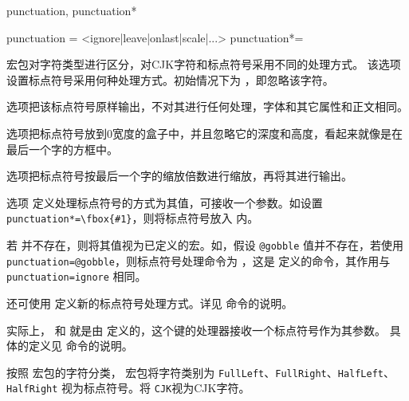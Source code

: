 \documentclass{ctxdoc}
\begin{document}
\begin{function}{punctuation, punctuation*}
  \begin{syntax}
    punctuation = <ignore|leave|onlast|scale|...> 
    punctuation*= 
  \end{syntax}
   宏包对字符类型进行区分，对CJK字符和标点符号采用不同的处理方式。
  该选项设置标点符号采用何种处理方式。初始情况下为 ，即忽略该字符。

   选项把该标点符号原样输出，不对其进行任何处理，字体和其它属性和正文相同。

   选项把标点符号放到0宽度的盒子中，并且忽略它的深度和高度，看起来就像是在最后一个字的方框中。

   选项把标点符号按最后一个字的缩放倍数进行缩放，再将其进行输出。
  
  选项  定义处理标点符号的方式为其值，可接收一个参数。如设置 \verb|punctuation*=\fbox{#1}|，则将标点符号放入  内。
  
  若  并不存在，则将其值视为已定义的宏。如，假设 \verb|@gobble| 值并不存在，若使用 \verb|punctuation=@gobble|，则标点符号处理命令为 ，这是 \LaTeXe 定义的命令，其作用与 \verb|punctuation=ignore| 相同。
  
  还可使用  定义新的标点符号处理方式。详见  命令的说明。
  
  实际上， 和  就是由  定义的，这个键的处理器接收一个标点符号作为其参数。
  具体的定义见  命令的说明。
\end{function}
\begin{texnote}
  按照  宏包的字符分类， 宏包将字符类别为 \verb|FullLeft|、\verb|FullRight|、\verb|HalfLeft|、\verb|HalfRight| 视为标点符号。将 \verb|CJK|视为CJK字符。
\end{texnote}
\end{document}
